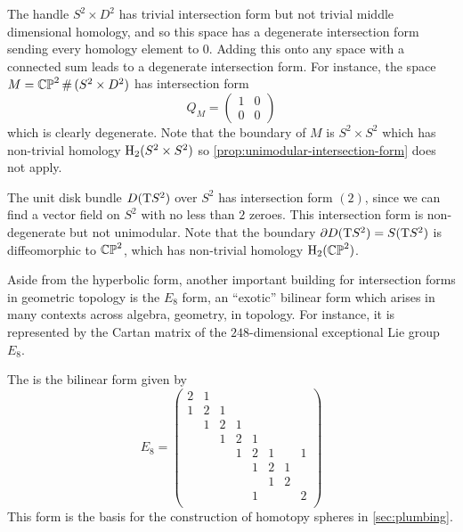 \begin{example}
	The handle $S^2\times D^2$ has trivial intersection form but not trivial middle dimensional homology, and so this space has a degenerate intersection form sending every homology element to $0$. Adding this onto any space with a connected sum leads to a degenerate intersection form.
	For instance, the space $M=\CP^2\+(S^2\times D^2)$ has intersection form
	\[
		Q_M = \begin{pmatrix}
			1 & 0 \\ 0 & 0
		\end{pmatrix}
	\]
	which is clearly degenerate. Note that the boundary of $M$ is $S^2\times S^2$ which has non-trivial homology $\operatorname{H}_2(S^2\times S^2)$ so \cref{prop:unimodular-intersection-form} does not apply.
\end{example}

\begin{example}
	The unit disk bundle $D(\mathrm{T} S^2)$ over $S^2$ has intersection form $(2)$, since we can find a vector field on $S^2$ with no less than $2$ zeroes. This intersection form is non-degenerate but not unimodular. Note that the boundary $\partial D(\mathrm{T} S^2)= S(\mathrm{T} S^2)$ is diffeomorphic to $\mathbb{CP}^2$, which has non-trivial homology $\operatorname{H}_2(\mathbb{CP}^2)$.
\end{example}

Aside from the hyperbolic form, another important building for intersection forms in geometric topology is the $E_8$ form, an ``exotic'' bilinear form which arises in many contexts across algebra, geometry, in topology. For instance, it is represented by the Cartan matrix of the $248$-dimensional exceptional Lie group $E_8$.

\begin{definition}
	The  is the bilinear form given by
	\[
		E_8=
		\begin{pmatrix}
			2 & 1 &   &   &   &   &   &   \\
			1 & 2 & 1 &   &   &   &   &   \\
			  & 1 & 2 & 1 &   &   &   &   \\
			  &   & 1 & 2 & 1 &   &   &   \\
			  &   &   & 1 & 2 & 1 &   & 1 \\
			  &   &   &   & 1 & 2 & 1 &   \\
			  &   &   &   &   & 1 & 2 &   \\
			  &   &   &   & 1 &   &   & 2 \\
		\end{pmatrix}
	\]
	This form is the basis for the construction of homotopy spheres in \cref{sec:plumbing}.
\end{definition}


